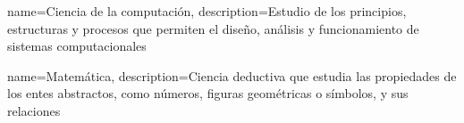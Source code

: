 {
    name=Ciencia de la computación,
    description={Estudio de los principios, estructuras y procesos que permiten el diseño, análisis y funcionamiento de sistemas computacionales}
}

{
    name=Matemática,
    description={Ciencia deductiva que estudia las propiedades de los entes abstractos, como números, figuras geométricas o símbolos, y sus relaciones}
}